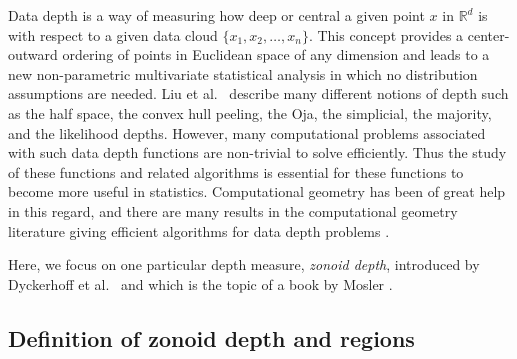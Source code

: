 \documentclass[charterfonts,lotsofwhite]{patmorin}
\begin{document}
Data depth is a way of measuring how deep or central a given point $x$
in $\mathbb{R}^d$ is with respect to a given data cloud $\{x_1, x_2,
\ldots, x_n\}$. This concept provides a center-outward ordering of
points in Euclidean space of any dimension and leads to a new
non-parametric multivariate statistical analysis in which no
distribution assumptions are needed. Liu et al.\
\cite{multivariate_analysis_by_data_depth} describe many different
notions of depth such as the half space, the convex hull peeling, the
Oja, the simplicial, the majority, and the likelihood depths. However,
many computational problems associated with such data depth functions
are non-trivial to solve efficiently.  Thus the study of these
functions and related algorithms is essential for these functions to
become more useful in statistics. Computational geometry
\cite{preparata_book} has been of great help in this regard, and there
are many results in the computational geometry literature giving
efficient algorithms for data depth problems
\cite{regression_depth_and_center_points, aloupis_mcs_thesis,
algorithms_for_bivariate_medians_and_a_fermat_torricelli_problem_for_lines,
an_optimized_randomized_algorithm_for_maximum_tukey_depth,
on_khulls_and_related_problems,
zonoid_data_depth_theory_and_computation,
computing_the_centerpoint_of_a_finite_planar_set_of_points_in_linear_time,
on_a_triangle_counting_problem, langerman_phd_thesis,
the_complexity_of_hyperplane_depth_in_the_plane,
optimization_in_arrangements,
computing_the_center_of_planar_point_sets,
fast_implementation_of_depth_contours_using_topological_sweep,
statistical_algorithms_the_oja_bivariate_median,
efficient_algorithms_for_maximum_regression_depth,
a_lower_bound_for_computing_oja_depth,
on_the_computation_of_the_bivariate_median_and_a_fermat_torricelli_problem,
on_the_convex_layers_of_a_planar_set,
on_algorithms_for_simplicial_depth,
constructing_the_bivariate_tukey_median,
geometry_and_statistics_problems_at_the_interface,
some_new_algorithms_and_software_implementation_methods_for_pattern_recognition_research}.

Here, we focus on one particular depth measure, \emph{zonoid depth},
introduced by Dyckerhoff et al.\
\cite{zonoid_data_depth_theory_and_computation} and which is the topic
of a book by Mosler \cite{mosler_book}.

\subsection{Definition of zonoid depth and regions}
\label{subsection_definition_of_zonoid_depth_and_regions}
\end{document}
